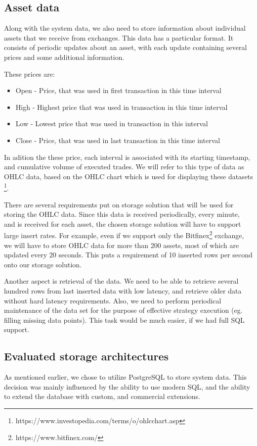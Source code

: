 \subsection{Asset data}
\label{section:ohlc}
Along with the system data, we also need to store information about individual assets that we receive from exchanges.
This data has a particular format. It consists of periodic updates about an asset, with each update containing several
prices and some additional information.

These prices are:
\begin{itemize}
    \item{Open - } Price, that was used in first transaction in this time interval
    \item{High - } Highest price that was used in transaction in this time interval
    \item{Low - }  Lowest price that was used in transaction in this interval
    \item{Close -} Price, that was used in last transaction in this time interval
\end{itemize}

In adition the these price, each interval is associated with its starting timestamp, and cumulative volume
of executed trades. We will refer to this type of data as OHLC data, based on the OHLC chart which is used for displaying
these datasets \footnote{https://www.investopedia.com/terms/o/ohlcchart.asp}.

There are several requirements put on storage solution that will be used for storing the OHLC data. Since this data is received periodically,
every minute, and is received for each asset, the chosen storage solution will have to support large insert rates. For example,
even if we support only the Bitfinex\footnote{https://www.bitfinex.com/} exchange, we will have to store OHLC data for more than 200 assets,
most of which are updated every 20 seconds. This puts a requirement of 10 inserted rows per second onto our storage solution.

Another aspect is retrieval of the data. We need to be able to retrieve several hundred rows from last inserted data with
low latency, and retrieve older data without hard latency requirements. Also, we need to perform periodical maintenance
of the data set for the purpose of effective strategy execution (eg. filling missing data points). This task would be
much easier, if we had full SQL support.


\subsection{Evaluated storage architectures}
As mentioned earlier, we chose to utilize PostgreSQL to store system data. This decision was mainly influenced by the
ability to use modern SQL, and the ability to extend the database with custom, and commercial extensions.

